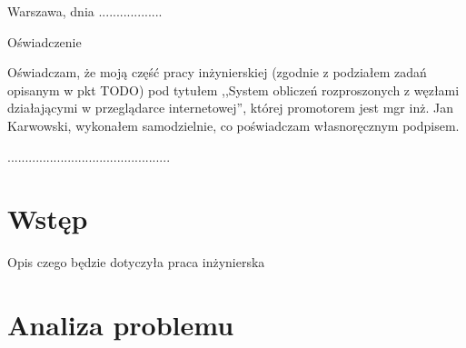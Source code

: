 \documentclass[a4paper,11pt,twoside]{report}
\theoremstyle{definition}
\newcommand{\tytul}{System obliczeń rozproszonych z węzłami działającymi w przeglądarce internetowej}
\newcommand{\type}{inżyniers} %
\newcommand{\supervisor}{mgr inż. Jan Karwowski}
\begin{document}


\null\thispagestyle{empty}\newpage

\null \hfill Warszawa, dnia ..................\\

\par\vspace{5cm}

\begin{center}
Oświadczenie
\end{center}

\indent Oświadczam, że moją część pracy \type kiej (zgodnie z podziałem zadań opisanym w pkt TODO) pod
tytułem ,,\tytul '', której promotorem jest \supervisor , wykonałem
samodzielnie, co poświadczam własnoręcznym podpisem.
\vspace{2cm}


\begin{flushright}
  \begin{minipage}{50mm}
    \begin{center}
      ..............................................

    \end{center}
  \end{minipage}
\end{flushright}

\thispagestyle{empty}
\newpage

\null\thispagestyle{empty}\newpage


\tableofcontents
\thispagestyle{empty}

\newpage %

\null\thispagestyle{empty}\newpage
\pagestyle{fancy}
\setcounter{page}{11} %

\chapter{Wstęp}
    Opis czego będzie dotyczyła praca inżynierska

\chapter{Analiza problemu}
\end{document}
